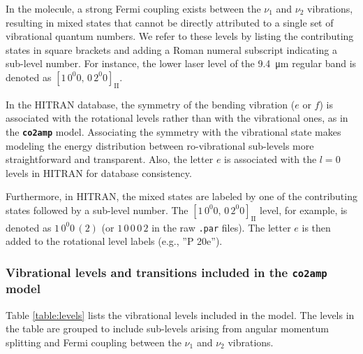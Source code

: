 In the  molecule, a strong Fermi coupling exists between the $\nu_1$ and $\nu_2$ vibrations, resulting in mixed states that cannot be directly attributed to a single set of vibrational quantum numbers. We refer to these levels by listing the contributing states in square brackets and adding a Roman numeral subscript indicating a sub-level number. For instance, the lower laser level of the \SI{9.4}{\micro\meter} regular band is denoted as $[1\,0^{0}0,\,0\,2^{0}0]_{\mathrm{II}}$.

In the HITRAN database, the symmetry of the bending vibration ($e$ or $f$) is associated with the rotational levels rather than with the vibrational ones, as in the \textbf{\texttt{co2amp}} model. Associating the symmetry with the vibrational state makes modeling the energy distribution between ro-vibrational sub-levels more straightforward and transparent. Also, the letter $e$ is associated with the $l = 0$ levels in HITRAN for database consistency.

Furthermore, in HITRAN, the mixed states are labeled by one of the contributing states followed by a sub-level number. The $[1\,0^{0}0,\,0\,2^{0}0]_{\mathrm{II}}$ level, for example, is denoted as $1\,0^{0}0\,(2)$ (or $1\,0\,0\,0\,2$ in the raw \texttt{.par} files). The letter $e$ is then added to the rotational level labels (e.g., ''P 20e'').




\subsubsection{Vibrational levels and transitions included in the \textbf{\texttt{co2amp}} model}

Table \ref{table:levels} lists the vibrational levels included in the model. The levels in the table are grouped to include sub-levels arising from angular momentum splitting and Fermi coupling between the $\nu_1$ and $\nu_2$ vibrations.

